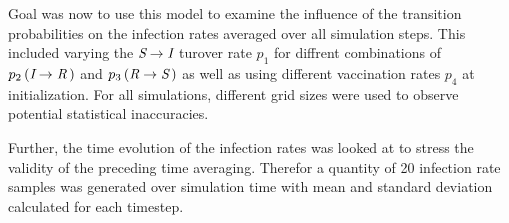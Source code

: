 Goal was now to use this model to examine the influence of the transition probabilities on the infection rates averaged over all simulation steps. This included varying the $\textit{S}\rightarrow\textit{I}$ turover rate $p_1$
for diffrent combinations of $p_2\left(\textit{I}\rightarrow\textit{R}\,\right)$ and $p_3\left(\textit{R}\rightarrow\textit{S}\,\right)$ as well as using different vaccination rates $p_4$ at initialization. 
For all simulations, different grid sizes were used to observe potential statistical inaccuracies.

Further, the time evolution of the infection rates was looked at to stress the validity of the preceding time averaging. Therefor a quantity of 20 infection rate samples was generated over simulation time
with mean and standard deviation calculated for each timestep.